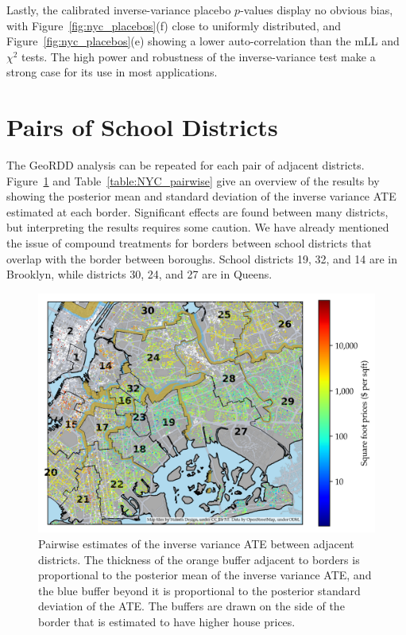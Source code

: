 \documentclass[letter,12pt]{article}
\begin{document}
Lastly, the calibrated inverse-variance placebo \(p\)-values display no obvious bias, with Figure~\ref{fig:nyc_placebos}(f) close to uniformly distributed, and Figure~\ref{fig:nyc_placebos}(e) showing a lower auto-correlation than the mLL and \(\chi^2\) tests.
The high power and robustness of the inverse-variance test make a strong case for its use in most applications.



\hypertarget{pairs-of-school-districts}{%
\section{Pairs of School Districts}\label{pairs-of-school-districts}}



The GeoRDD analysis can be repeated for each pair of adjacent districts.
Figure~\ref{fig:NYC_pairwise} and Table~\ref{table:NYC_pairwise} give an overview of the results by showing the posterior mean and standard deviation of the inverse variance ATE estimated at each border.
Significant effects are found between many districts, but interpreting the results requires some caution.
We have already mentioned the issue of compound treatments for borders between school districts that overlap with the border between boroughs.
School districts 19, 32, and 14 are in Brooklyn, while districts 30, 24, and 27 are in Queens.


\begin{figure}[tbp]
    \centering
    \includegraphics[width=\textwidth,height=0.7\textheight,keepaspectratio]{../NYC/NYC_plots/pairwise_mean_se.png}
    \caption{\label{fig:NYC_pairwise}
        Pairwise estimates of the inverse variance ATE between adjacent districts.
        The thickness of the orange buffer adjacent to borders is proportional to the posterior mean of the inverse variance ATE, and the blue buffer beyond it is proportional to the posterior standard deviation of the ATE.
    The buffers are drawn on the side of the border that is estimated to have higher house prices.}
\end{figure}
\end{document}

